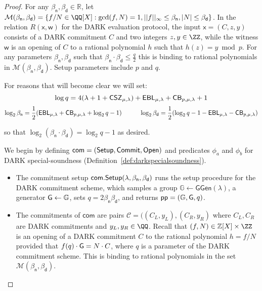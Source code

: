 \begin{proof} 

For any $\beta_\textsf{n}, \beta_\textsf{d} \in \mathbb{R}$, let $\mathcal{M}(\beta_\textsf{n}, \beta_\textsf{d}) = \{f/N \in \QQ[X]: \gcd(f, N) = 1, ||f||_\infty \leq \beta_\textsf{n}, |N| \leq \beta_\textsf{d}\}$. In the relation $R(\mathsf{x}, \mathsf{w})$ for the DARK evaluation protocol, the input $\mathsf{x} = (C, z, y)$ consists of a DARK commitment $C$ and two integers $z, y \in \ZZ$, while the witness $\mathsf{w}$ is an opening of $C$ to a rational polynomial $h$ such that $h(z) = y \bmod p$. For any parameters $\beta_\textsf{n}, \beta_\textsf{d}$ such that $\beta_\textsf{n} \cdot \beta_\textsf{d} \leq \frac{q}{2}$ this is binding to rational polynomials in $\mathcal{M}(\beta_\textsf{n}, \beta_\textsf{d})$. Setup parameters include $p$ and $q$. 

For reasons that will become clear we will set: 
$$\log q = 4(\lambda + 1 + \CSZ[\mu]) + \EBL[\mu] + \CorrectnessBound + 1$$
$$\log_2 \beta_\textsf{n} = \frac{1}{2} (\mathsf{EBL}_{\mu, \lambda} + \mathsf{CB}_{p, \mu, \lambda} + \log_2 q - 1) \hspace{10mm} \log_2 \beta_\textsf{d} = \frac{1}{2} (\log_2 q - 1 - \mathsf{EBL}_{\mu, \lambda} -  \mathsf{CB}_{p, \mu, \lambda}) $$

so that $\log_2 (\beta_\textsf{n} \cdot \beta_{\textsf{d}}) = \log_2 q - 1$ as desired. 
\medskip 

We begin by defining $\textsf{com} = (\setup, \textsf{Commit}, \open)$ and predicates $\phi_a$ and $\phi_b$ for DARK special-soundness (Definition~\ref{def:darkspecialsoundness}). %
 
\begin{itemize} 
\item The commitment setup $\textsf{com}.\setup(\lambda, \beta_\textsf{n}, \beta_\textsf{d})$ runs the setup procedure for the DARK commitment scheme, which samples a group $\mathbb{G} \gets \textsf{GGen}(\lambda)$, a generator $\gr{G} \gets \mathbb{G}$, sets $q = 2 \beta_\textsf{n} \beta_\textsf{d}$, and returns $\crs = (\mathbb{G}, \gr{G}, q)$. 
\item The commitments of $\textsf{com}$ are pairs $\mathcal{C} = ((C_L, y_L), (C_R, y_R)$ where $C_L, C_R$ are DARK commitments and $y_L, y_R \in \QQ$. Recall that $(f, N) \in \mathbb{Z}[X] \times \ZZ$ is an opening of a DARK commitment $C$ to the rational polynomial $h = f/N$ provided that  $f(q) \cdot \gr{G} = N \cdot C$, where $q$ is a parameter of the DARK commitment scheme. This is binding to rational polynomials in the set $\mathcal{M}(\beta_\textsf{n}, \beta_\textsf{d})$.


\end{itemize}
\end{proof}
